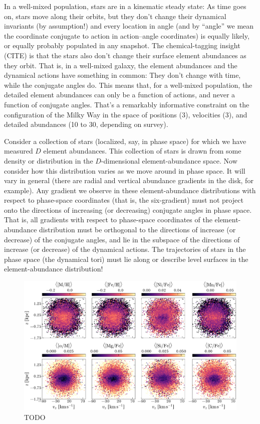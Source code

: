 \documentclass[modern]{aastex63}
\begin{document}
In a well-mixed population, stars are in a kinematic steady state:
As time goes on, stars move along their orbits, but they don't change their dynamical
invariants (by assumption!) and every location in angle (and by ``angle'' we mean the
coordinate conjugate to action in action--angle coordinates) is equally likely, or
equally probably populated in any snapshot.
The chemical-tagging insight (CITE) is that the stars also don't change
their surface element abundances as they orbit.
That is, in a well-mixed galaxy, the element abundances and the dynamical actions have
something in common:
They don't change with time, while the conjugate angles do.
This means that, for a well-mixed population, the detailed element abundances can only
be a function of actions, and never a function of conjugate angles.
That's a remarkably informative constraint on the configuration of the Milky Way in
the space of positions (3), velocities (3), and detailed abundances (10 to 30, depending
on survey).

Consider a collection of stars (localized, say, in phase space) for which we have
measured $D$ element abundances.
This collection of stars is drawn from some density or distribution in
the $D$-dimensional element-abundance space.
Now consider how this distribution varies as we move around in phase space.
It will vary in general (there are radial and vertical abundance gradients in the
disk, for example).
Any gradient we observe in these element-abundance distributions with respect to
phase-space coordinates (that is, the six-gradient) must not project
onto the directions of increasing (or decreasing) conjugate angles in phase space.
That is, all gradients with respect to phase-space coordinates
of the element-abundance distribution must be orthogonal to the
directions of increase (or decrease) of the conjugate angles, and lie in the subspace
of the directions of increase (or decrease) of the dynamical actions.
The trajectories of stars in the phase space (the dynamical tori) must lie along or
describe level surfaces in the element-abundance distribution!

\begin{figure}[!t]
  \begin{center}
  \includegraphics[width=\textwidth]{abundance-zvz-grid.pdf}
  \end{center}
  \caption{%
    TODO
  \label{fig:zvz-grid}
  }
\end{figure}
\end{document}

